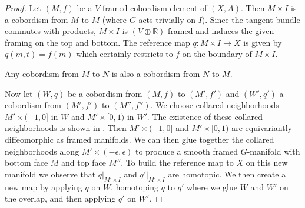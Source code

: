 \documentclass[11pt]{amsart}
\newcommand{\R}{\mathbb R}
\theoremstyle{plain}   %
\theoremstyle{definition}
\theoremstyle{remark}
\numberwithin{equation}{section}
\begin{document}
\begin{proof}
Let $(M,f)$ be a $V$-framed cobordism element of $(X,A)$. Then $M\times I$ is a cobordism from $M$ to $M$ (where $G$ acts trivially on $I$). Since the tangent bundle commutes with products, $M\times I$ is $(V\oplus \R)$-framed and induces the given framing on the top and bottom. The reference map $q:M\times I\to X$ is given by $q(m,t)=f(m)$ which certainly restricts to $f$ on the boundary of $M\times I$. 

Any cobordism from $M$ to $N$ is also a cobordism from $N$ to $M$. 

Now let $(W,q)$ be a cobordism from $(M,f)$ to $(M',f')$ and $(W',q')$ a cobordism from $(M',f')$ to $(M'',f'')$. We choose collared neighborhoods $M'\times (-1,0]$ in $W$ and $M'\times [0,1)$ in $W'$. The existence of these collared neighborhoods is shown in \cite{gimm}. Then $M'\times(-1,0]$ and $M'\times[0,1)$ are equivariantly diffeomorphic as framed manifolds. We can then glue together the collared neighborhoods along $M'\times(-\epsilon,\epsilon)$ to produce a smooth framed $G$-manifold with bottom face $M$ and top face $M''$. To build the reference map to $X$ on this new manifold we observe that $q|_{M'\times I}$ and $q'|_{M'\times I}$ are homotopic. We then create a new map by applying $q$ on $W$, homotoping $q$ to $q'$ where we glue $W$ and $W'$ on the overlap, and then applying $q'$ on $W'$.
\end{proof}
\end{document}

